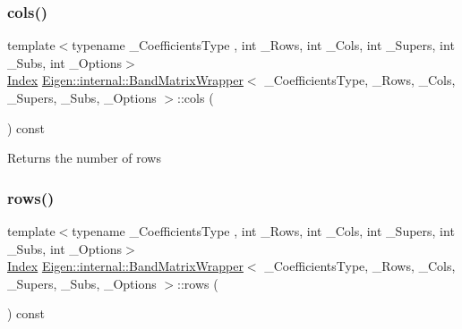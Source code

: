 \subsubsection{\texorpdfstring{cols()}{cols()}}
{\footnotesize\ttfamily template$<$typename \+\_\+\+Coefficients\+Type , int \+\_\+\+Rows, int \+\_\+\+Cols, int \+\_\+\+Supers, int \+\_\+\+Subs, int \+\_\+\+Options$>$ \\
\mbox{\hyperlink{struct_eigen_1_1_eigen_base_a554f30542cc2316add4b1ea0a492ff02}{Index}} \mbox{\hyperlink{class_eigen_1_1internal_1_1_band_matrix_wrapper}{Eigen\+::internal\+::\+Band\+Matrix\+Wrapper}}$<$ \+\_\+\+Coefficients\+Type, \+\_\+\+Rows, \+\_\+\+Cols, \+\_\+\+Supers, \+\_\+\+Subs, \+\_\+\+Options $>$\+::cols (\begin{DoxyParamCaption}{ }\end{DoxyParamCaption}) const\hspace{0.3cm}{\ttfamily [inline]}}

\begin{DoxyReturn}{Returns}
the number of rows 
\end{DoxyReturn}
\mbox{\label{class_eigen_1_1internal_1_1_band_matrix_wrapper_a8d23b9d25729ac15c06591c810d13160}} 
\subsubsection{\texorpdfstring{rows()}{rows()}}
{\footnotesize\ttfamily template$<$typename \+\_\+\+Coefficients\+Type , int \+\_\+\+Rows, int \+\_\+\+Cols, int \+\_\+\+Supers, int \+\_\+\+Subs, int \+\_\+\+Options$>$ \\
\mbox{\hyperlink{struct_eigen_1_1_eigen_base_a554f30542cc2316add4b1ea0a492ff02}{Index}} \mbox{\hyperlink{class_eigen_1_1internal_1_1_band_matrix_wrapper}{Eigen\+::internal\+::\+Band\+Matrix\+Wrapper}}$<$ \+\_\+\+Coefficients\+Type, \+\_\+\+Rows, \+\_\+\+Cols, \+\_\+\+Supers, \+\_\+\+Subs, \+\_\+\+Options $>$\+::rows (\begin{DoxyParamCaption}{ }\end{DoxyParamCaption}) const\hspace{0.3cm}{\ttfamily [inline]}}

